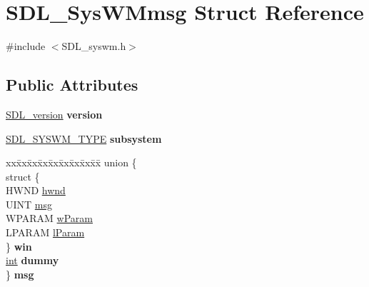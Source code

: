 \hypertarget{struct_s_d_l___sys_w_mmsg}{}\section{S\+D\+L\+\_\+\+Sys\+W\+Mmsg Struct Reference}
\label{struct_s_d_l___sys_w_mmsg}


{\ttfamily \#include $<$S\+D\+L\+\_\+syswm.\+h$>$}

\subsection*{Public Attributes}
\begin{DoxyCompactItemize}
\item 
\hypertarget{struct_s_d_l___sys_w_mmsg_a95f9aae58d18ee8fac556416b322a5fb}{}\hyperlink{struct_s_d_l__version}{S\+D\+L\+\_\+version} {\bfseries version}\label{struct_s_d_l___sys_w_mmsg_a95f9aae58d18ee8fac556416b322a5fb}

\item 
\hypertarget{struct_s_d_l___sys_w_mmsg_a7c3900af5ea797f1318fc77ee0ecd11b}{}\hyperlink{_s_d_l__syswm_8h_a064c26598287280fff2a00d6758ac4f7}{S\+D\+L\+\_\+\+S\+Y\+S\+W\+M\+\_\+\+T\+Y\+P\+E} {\bfseries subsystem}\label{struct_s_d_l___sys_w_mmsg_a7c3900af5ea797f1318fc77ee0ecd11b}

\item 
\hypertarget{struct_s_d_l___sys_w_mmsg_ab335ec53e6a311405995c0e81981a7ae}{}\begin{tabbing}
xx\=xx\=xx\=xx\=xx\=xx\=xx\=xx\=xx\=\kill
union \{\\
\>struct \{\\
\>\>HWND \hyperlink{struct_s_d_l___sys_w_mmsg_a55cf9583b5eddfe60a5c9851f9cce457}{hwnd}\\
\>\>UINT \hyperlink{struct_s_d_l___sys_w_mmsg_a74894ed060d5508ab06aac584154d61e}{msg}\\
\>\>WPARAM \hyperlink{struct_s_d_l___sys_w_mmsg_a7463730478d90ebc031d83098f3f74fc}{wParam}\\
\>\>LPARAM \hyperlink{struct_s_d_l___sys_w_mmsg_a24c1e4c3cb8d9781d34e5d99df66ac36}{lParam}\\
\>\} {\bfseries win}\\
\>\hyperlink{_s_d_l__thread_8h_a6a64f9be4433e4de6e2f2f548cf3c08e}{int} {\bfseries dummy}\\
\} {\bfseries msg}\label{struct_s_d_l___sys_w_mmsg_ab335ec53e6a311405995c0e81981a7ae}
\\

\end{tabbing}\end{DoxyCompactItemize}



